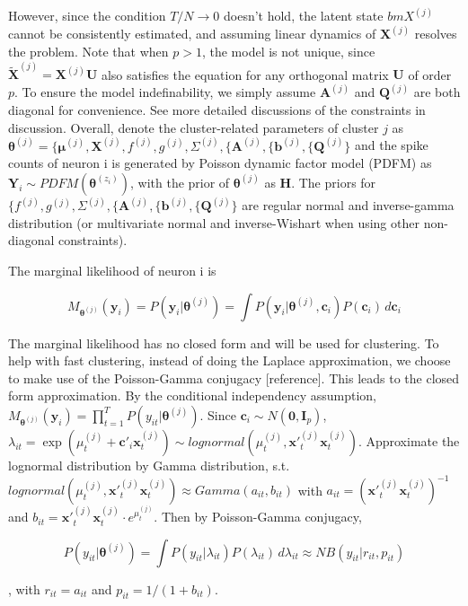 \documentclass{article}
\begin{document}
	However, since the condition $T/N \rightarrow 0$ doesn’t hold, the latent state $bm{X}^{(j)}$ cannot be consistently estimated, and assuming linear dynamics of $\bm{X}^{(j)}$ resolves the problem. Note that when $p>1$, the model is not unique, since $\widetilde{\bm{X}}^{(j)} = \bm{X}^{(j)}\bm{U}$ also satisfies the equation for any orthogonal matrix $\bm{U}$ of order $p$. To ensure the model indefinability, we simply assume $\bm{A}^{(j)}$ and $\bm{Q}^{(j)}$
	are both diagonal for convenience. See more detailed discussions of the constraints in discussion. Overall, denote the cluster-related parameters of cluster $j$ as $\bm{\theta}^{(j)}= \{\bm{\mu}^{(j)}, \bm{X}^{(j)}, f^{(j)}, g^{(j)}, \Sigma^{(j)},\{\bm{A}^{(j)}, \{\bm{b}^{(j)}, \{\bm{Q}^{(j)}\}$ and the spike counts of neuron i is generated by Poisson dynamic factor model (PDFM) as $\bm{Y}_i\sim PDFM(\bm{\theta}^{(z_i)})$, with the prior of $\bm{\theta}^{(j)}$ as $\bm{H}$. The priors for $\{f^{(j)}, g^{(j)}, \Sigma^{(j)},\{\bm{A}^{(j)}, \{\bm{b}^{(j)}, \{\bm{Q}^{(j)}\}$ are regular  normal and inverse-gamma distribution (or multivariate normal and inverse-Wishart when using other non-diagonal constraints).

	The marginal likelihood of neuron i is
	
	$$M_{\bm{\theta}^{(j)}}(\bm{y}_i) = P(\bm{y}_i|\bm{\theta}^{(j)}) = \int P(\bm{y}_i|\bm{\theta}^{(j)}, \bm{c}_i)P(\bm{c}_i)\,d\bm{c}_i$$
	
	The marginal likelihood has no closed form and will be used for clustering. To help with fast clustering, instead of doing the Laplace approximation, we choose to make use of the Poisson-Gamma conjugacy [reference]. This leads to the closed form approximation. By the conditional independency assumption, $M_{\bm{\theta}^{(j)}}(\bm{y}_i)=\prod_{t=1}^{T}P(y_{it}|\bm{\theta}^{(j)})$. Since $\bm{c}_i\sim N(\bm{0},\bm{I}_p)$, $\lambda_{it} = \exp(\mu_t^{(j)} + \bm{c}'_i\bm{x}^{(j)}_t)\sim lognormal(\mu_t^{(j)}, \bm{x}'^{(j)}_t\bm{x}^{(j)}_t)$. Approximate the lognormal distribution by Gamma distribution, s.t. $lognormal(\mu_t^{(j)}, \bm{x}'^{(j)}_t\bm{x}^{(j)}_t) \approx Gamma(a_{it}, b_{it})$ with $a_{it} = (\bm{x}'^{(j)}_t\bm{x}^{(j)}_t)^{-1}$ and $b_{it} = \bm{x}'^{(j)}_t\bm{x}^{(j)}_t\cdot e^{\mu_t^{(j)}}$. Then by Poisson-Gamma conjugacy,
	
	$$
	P(y_{it}|\bm{\theta}^{(j)}) = \int P(y_{it}|\lambda_{it})P(\lambda_{it})\,d\lambda_{it}\approx NB(y_{it}|r_{it}, p_{it})
	$$
	
	, with $r_{it} = a_{it}$ and $p_{it} = 1/(1 + b_{it})$.
	
\end{document}
